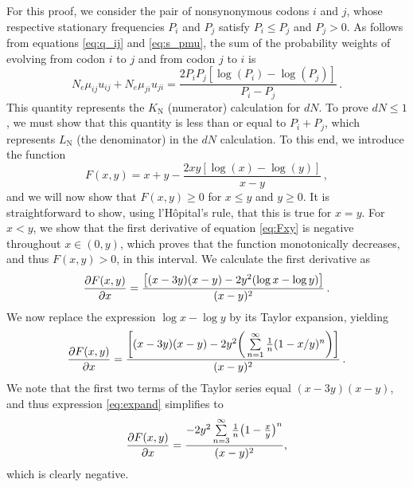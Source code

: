 \documentclass[11pt]{article}
\begin{document}
For this proof, we consider the pair of nonsynonymous codons $i$ and $j$, whose respective stationary frequencies $P_i$ and $P_j$ satisfy $P_i \leq P_j$ and $P_j > 0$. As follows from equations \eqref{eq:q_ij} and \eqref{eq:s_pmu}, the sum of the probability weights of evolving from codon $i$ to $j$ and from codon $j$ to $i$ is
\begin{equation}
N_e\mu_{ij} u_{ij} + N_e\mu_{ji} u_{ji}  = \frac{2P_iP_j[\log(P_i) - \log(P_j)]}{P_i - P_j} \,.
\end{equation}
This quantity represents the $K_\text{N}$ (numerator) calculation for $dN$. To prove $dN \leq 1$, we must show that this quantity is less than or equal to $P_i + P_j$, which represents $L_\text{N}$ (the denominator) in the $dN$ calculation. To this end, we introduce the function 
\begin{equation}\label{eq:Fxy}
F(x,y) = x + y - \frac{2xy[\log(x) - \log(y)]}{x - y} \,,
\end{equation}
and we will now show that $F(x,y) \geq 0$ for $x \leq y$ and $y \geq 0 $. It is straightforward to show, using l'H\^{o}pital's rule, that this is true for $x=y$. For $x < y$, we show that the first derivative of equation \eqref{eq:Fxy} is negative throughout $x \in (0,y)$, which proves that the function monotonically decreases, and thus $F(x,y) > 0$, in this interval. We calculate the first derivative as 
\begin{equation}
\frac{\partial{F(x,y)}}{\partial{x}} = \frac{\big{[} (x-3y)(x-y) - 2y^2(\log{x} - \log{y}) \big{]}}{(x-y)^2} \,.
\end{equation}
We now replace the expression $\log{x} - \log{y}$ by its Taylor expansion, yielding
\begin{equation}\label{eq:expand}
	\frac{\partial{F(x,y)}}{\partial{x}} = 
	\frac{ \bigg{[} (x-3y)(x-y) - 2y^2\bigg{(}\sum\limits_{n=1}^\infty \frac{1}{n} (1-x/y)^n\bigg{)} \bigg{]}}{(x-y)^2} \,.
\end{equation} We note that the first two terms of the Taylor series equal $(x-3y)(x-y)$, and thus expression \eqref{eq:expand} simplifies to 
\begin{equation}
\frac{\partial{F(x,y)}}{\partial{x}} = \frac{-2y^2\sum\limits_{n=3}^\infty \frac{1}{n} \big{(}1-\frac{x}{y}\big{)}^n}{(x-y)^2} ,
\end{equation}
which is clearly negative. 


\bigskip
\end{document}
